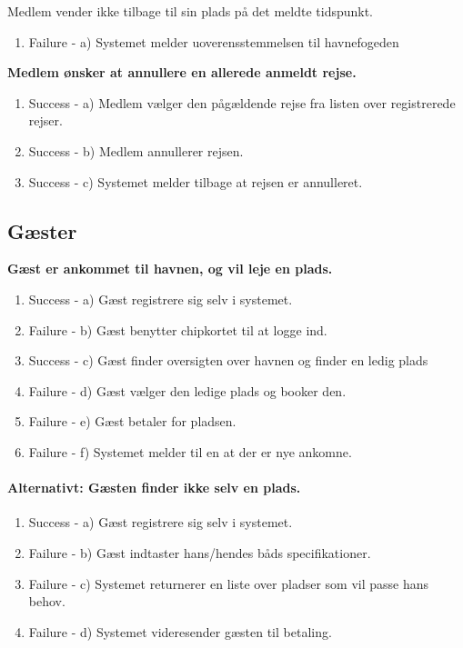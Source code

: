	\item{\bf{Medlem vender ikke tilbage til sin plads på det meldte tidspunkt.
	  \begin{enumerate}
			\item Failure -  a) Systemet melder uoverensstemmelsen til havnefogeden
	   \end{enumerate}

	\item{\bf{Medlem ønsker at annullere en allerede anmeldt rejse.}}
	  \begin{enumerate}
			\item Success -  a) Medlem vælger den pågældende rejse fra listen over registrerede rejser.
			\item Success -  b) Medlem annullerer rejsen.
			\item Success -  c) Systemet melder tilbage at rejsen er annulleret.
	   \end{enumerate}

\subsection{Gæster}
	\item{\bf{Gæst er ankommet til havnen, og vil leje en plads.}}
	  \begin{enumerate}
			\item Success -  a) Gæst registrere sig selv i systemet.
			\item Failure -  b) Gæst benytter chipkortet til at logge ind.
			\item Success -  c) Gæst finder oversigten over havnen og finder en ledig plads
			\item Failure -  d) Gæst vælger den ledige plads og booker den.
			\item Failure -  e) Gæst betaler for pladsen.
			\item Failure -  f) Systemet melder til en at der er nye ankomne.
	   \end{enumerate}
	   
	\paragraph{Alternativt: Gæsten finder ikke selv en plads.}
	  \begin{enumerate}
			\item Success - a) Gæst registrere sig selv i systemet.
			\item Failure - b) Gæst indtaster hans/hendes båds specifikationer.
			\item Failure - c) Systemet returnerer en liste over pladser som vil passe hans behov.
			\item Failure - d) Systemet videresender gæsten til betaling.
	   \end{enumerate}

}}

